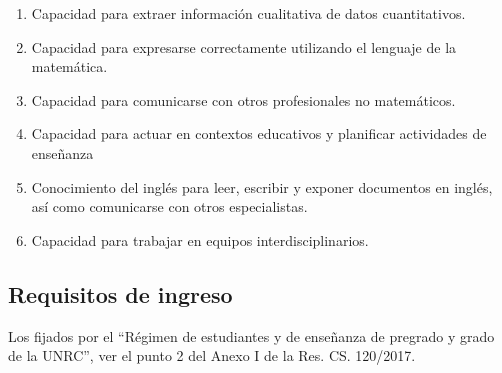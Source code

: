 \documentclass[a4paper, 12pt]{article}
\begin{document}
\begin{enumerate}
\item {Capacidad para extraer información
cualitativa de datos cuantitativos.} 
 


\item {Capacidad para expresarse correctamente
utilizando el lenguaje de la
matemática.} 
 


\item {Capacidad para comunicarse
con otros profesionales no matemáticos.} 

 

\item {Capacidad para actuar en contextos educativos y planificar actividades de enseñanza} 
 


\item {Conocimiento del inglés para
leer, escribir y exponer documentos en
inglés, así como comunicarse con otros
especialistas.} 

 


\item {Capacidad para trabajar en equipos
interdisciplinarios.} 

\end{enumerate}


\subsection{Requisitos de ingreso}



Los fijados por el ``Régimen  de estudiantes y de enseñanza de pregrado y grado de la UNRC'', ver  el punto 2 del Anexo I de la Res. CS. 120/2017. 
\end{document}

